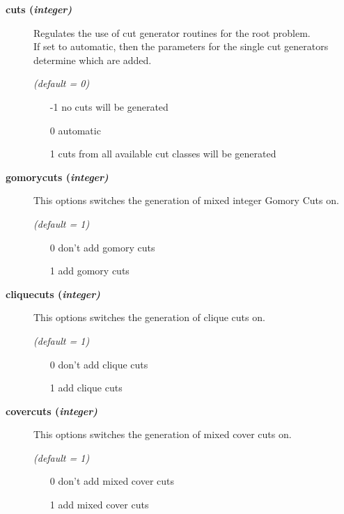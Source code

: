 \begin{description}
\item[\label{glpkcuts}\hypertarget{glpkcuts}
{\textbf{cuts (\slshape{integer})}}]\hspace{1.0in}

Regulates the use of cut generator routines for the root problem.\\
If set to automatic, then the parameters for the single cut generators determine which are added.

\textsl{(default = 0)}
\begin{itemize}
\item[-1] no cuts will be generated
\item[0] automatic
\item[1] cuts from all available cut classes will be generated
\end{itemize}

\item[\label{glpkgomorycuts}\hypertarget{glpkgomorycuts}
{\textbf{gomorycuts (\slshape{integer})}}]\hspace{1.0in}

This options switches the generation of mixed integer Gomory Cuts on.

\textsl{(default = 1)}
\begin{itemize}
\item[0] don't add gomory cuts
\item[1] add gomory cuts
\end{itemize}


\item[\label{glpkcliquecuts}\hypertarget{glpkcliquecuts}
{\textbf{cliquecuts (\slshape{integer})}}]\hspace{1.0in}

This options switches the generation of clique cuts on.

\textsl{(default = 1)}
\begin{itemize}
\item[0] don't add clique cuts
\item[1] add clique cuts
\end{itemize}


\item[\label{glpkcovercuts}\hypertarget{glpkcovercuts}
{\textbf{covercuts (\slshape{integer})}}]\hspace{1.0in}

This options switches the generation of mixed cover cuts on.

\textsl{(default = 1)}
\begin{itemize}
\item[0] don't add mixed cover cuts
\item[1] add mixed cover cuts
\end{itemize}



\end{description}
